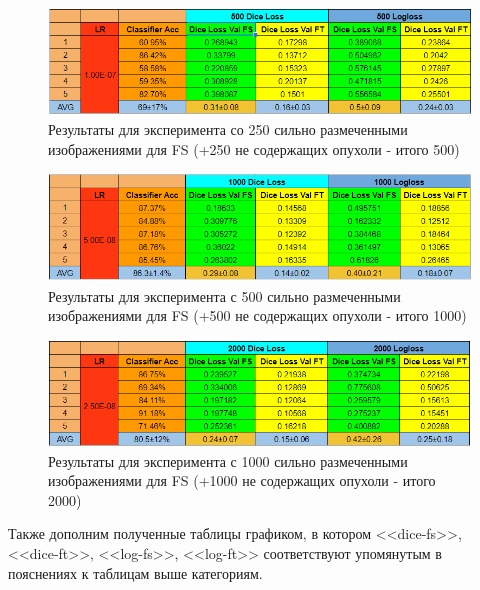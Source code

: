 \begin{figure}[h!] 
  \center
  \includegraphics [scale=1.0] {images/experiment_500.png}
  \caption{  Результаты для эксперимента со 250 сильно размеченными изображениями для FS (+250 не содержащих опухоли - итого 500)} 
\end{figure}

\begin{figure}[h!] 
  \center
  \includegraphics [scale=1.0] {images/experiment_1000.png}
  \caption{  Результаты для эксперимента с 500 сильно размеченными изображениями для FS (+500 не содержащих опухоли - итого 1000)} 
\end{figure}

\begin{figure}[h!] 
  \center
  \includegraphics [scale=1.0] {images/experiment_2000.png}
  \caption{  Результаты для эксперимента с 1000 сильно размеченными изображениями для FS (+1000 не содержащих опухоли - итого 2000)} 
\end{figure}

Также дополним полученные таблицы графиком, в котором <<dice-fs>>, <<dice-ft>>, <<log-fs>>, <<log-ft>> соответствуют упомянутым в пояснениях к таблицам выше категориям. 

